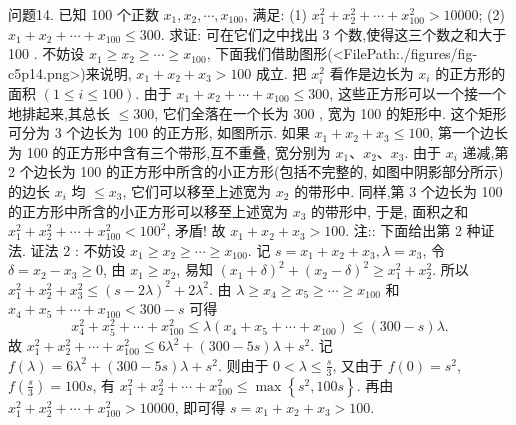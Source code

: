问题14. 已知 100 个正数 $x_1, x_2, \cdots, x_{100}$, 满足:
(1) $x_1^2+x_2^2+\cdots+x_{100}^2>10000$;
(2) $x_1+x_2+\cdots+x_{100} \leqslant 300$.
求证: 可在它们之中找出 3 个数,使得这三个数之和大于 100 .
不妨设 $x_1 \geqslant x_2 \geqslant \cdots \geqslant x_{100}$, 下面我们借助图形(<FilePath:./figures/fig-c5p14.png>)来说明, $x_1+x_2+x_3>100$ 成立.
把 $x_i^2$ 看作是边长为 $x_i$ 的正方形的面积 $(1 \leqslant i \leqslant 100)$.
由于 $x_1+x_2+\cdots+x_{100} \leqslant 300$, 这些正方形可以一个接一个地排起来,其总长 $\leqslant 300$, 它们全落在一个长为 300 , 宽为 100 的矩形中.
这个矩形可分为 3 个边长为 100 的正方形, 如图所示.
如果 $x_1+x_2+x_3 \leqslant 100$, 第一个边长为 100 的正方形中含有三个带形,互不重叠, 宽分别为 $x_1 、 x_2 、 x_3$.
由于 $x_i$ 递减,第 2 个边长为 100 的正方形中所含的小正方形(包括不完整的, 如图中阴影部分所示) 的边长 $x_i$ 均 $\leqslant x_3$, 它们可以移至上述宽为 $x_2$ 的带形中.
同样,第 3 个边长为 100 的正方形中所含的小正方形可以移至上述宽为 $x_3$ 的带形中, 于是, 面积之和 $x_1^2+x_2^2+\cdots+x_{100}^2<100^2$, 矛盾!
故 $x_1+x_2+x_3>100$.
注:: 下面给出第 2 种证法.
证法 2 : 不妨设 $x_1 \geqslant x_2 \geqslant \cdots \geqslant x_{100}$. 记 $s=x_1+x_2+x_3, \lambda=x_3$, 令 $\delta= x_2-x_3 \geqslant 0$, 由 $x_1 \geqslant x_2$, 易知 $\left(x_1+\delta\right)^2+\left(x_2-\delta\right)^2 \geqslant x_1^2+x_2^2$. 所以 $x_1^2+x_2^2+ x_3^2 \leqslant(s-2 \lambda)^2+2 \lambda^2$.
由 $\lambda \geqslant x_4 \geqslant x_5 \geqslant \cdots \geqslant x_{100}$ 和 $x_4+x_5+\cdots+x_{100}<300-s$ 可得
$$
x_4^2+x_5^2+\cdots+x_{100}^2 \leqslant \lambda\left(x_4+x_5+\cdots+x_{100}\right) \leqslant(300-s) \lambda .
$$
故 $x_1^2+x_2^2+\cdots+x_{100}^2 \leqslant 6 \lambda^2+(300-5 s) \lambda+s^2$.
记 $f(\lambda)=6 \lambda^2+(300-5 s) \lambda+s^2$. 则由于 $0<\lambda \leqslant \frac{s}{3}$, 又由于 $f(0)=s^2$, $f\left(\frac{s}{3}\right)=100 s$, 有 $x_1^2+x_2^2+\cdots+x_{100}^2 \leqslant \max \left\{s^2, 100 s\right\}$. 再由 $x_1^2+x_2^2+\cdots+ x_{100}^2>10000$, 即可得 $s=x_1+x_2+x_3>100$.



